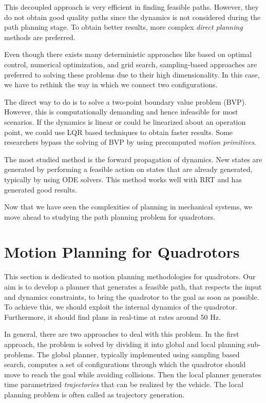 This decoupled approach is very efficient in finding feasible paths. However, they do not obtain good quality paths since the dynamics is not considered during the path planning stage. To obtain better results, more complex \textit{direct planning} methods are preferred. 

Even though there exists many deterministic approaches like based on optimal control, numerical optimization, and grid search, sampling-based approaches are preferred to solving these problems due to their high dimensionality. In this case, we have to rethink the way in which we connect two configurations. 

The direct way to do is to solve a two-point boundary value problem (BVP). However, this is computationally demanding and hence infeasible for most scenarios. If the dynamics is linear or could be linearized about an operation point, we could use LQR based techniques to obtain faster results. Some researchers bypass the solving of BVP by using precomputed \textit{motion primitives}.

The most studied method is the forward propagation of dynamics. New states are generated by performing a feasible action on states that are already generated, typically by using ODE solvers. This method works well with RRT and has generated good results. 

Now that we have seen the complexities of planning in mechanical systems, we move ahead to studying the path planning problem for quadrotors.

\section{Motion Planning for Quadrotors}
\label{sec:planning_quadrotors}
This section is dedicated to motion planning methodologies for quadrotors. 
Our aim is to develop a planner that generates a feasible path, that respects the input and dynamics constraints, to bring the quadrotor to the goal as soon as possible. To achieve this, we should exploit the internal dynamics of the quadrotor. Furthermore, it should find plans in real-time at rates around 50 Hz. 

In general, there are two approaches to deal with this problem. In the first approach, the problem is solved by dividing it into global and local planning sub-problems. The global planner, typically implemented using sampling based search, computes a set of configurations through which the quadrotor should move to reach the goal while avoiding collisions. Then the local planner generates time parametrized \textit{trajectories} that can be realized by the vehicle. The local planning problem is often called as trajectory generation. 

